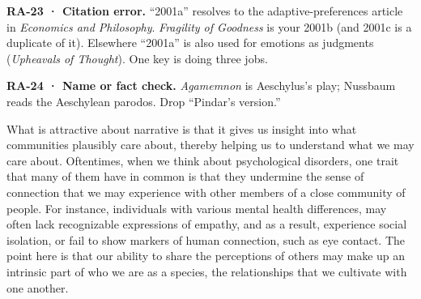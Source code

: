 \documentclass[
  letterpaper,
  DIV=11,
  numbers=noendperiod]{scrartcl}
\theoremstyle{remark}
\begin{document}
\begin{tcolorbox}[enhanced jigsaw, arc=.35mm, bottomrule=.15mm, bottomtitle=1mm, breakable, colback=white, colbacktitle=quarto-callout-warning-color!10!white, colframe=quarto-callout-warning-color-frame, coltitle=black, left=2mm, leftrule=.75mm, opacityback=0, opacitybacktitle=0.6, rightrule=.15mm, title=\textcolor{quarto-callout-warning-color}{\faExclamationTriangle}\hspace{0.5em}{Warning}, titlerule=0mm, toprule=.15mm, toptitle=1mm]

\textbf{RA-23 · Citation error.} ``2001a'' resolves to the
adaptive-preferences article in \emph{Economics and Philosophy}.
\emph{Fragility of Goodness} is your 2001b (and 2001c is a duplicate of
it). Elsewhere ``2001a'' is also used for emotions as judgments
(\emph{Upheavals of Thought}). One key is doing three jobs.

\end{tcolorbox}

\begin{tcolorbox}[enhanced jigsaw, arc=.35mm, bottomrule=.15mm, bottomtitle=1mm, breakable, colback=white, colbacktitle=quarto-callout-caution-color!10!white, colframe=quarto-callout-caution-color-frame, coltitle=black, left=2mm, leftrule=.75mm, opacityback=0, opacitybacktitle=0.6, rightrule=.15mm, title=\textcolor{quarto-callout-caution-color}{\faFire}\hspace{0.5em}{Caution}, titlerule=0mm, toprule=.15mm, toptitle=1mm]

\textbf{RA-24 · Name or fact check.} \emph{Agamemnon} is Aeschylus's
play; Nussbaum reads the Aeschylean parodos. Drop ``Pindar's version.''

\end{tcolorbox}

What is attractive about narrative is that it gives us insight into what
communities plausibly care about, thereby helping us to understand what
we may care about. Oftentimes, when we think about psychological
disorders, one trait that many of them have in common is that they
undermine the sense of connection that we may experience with other
members of a close community of people. For instance, individuals with
various mental health differences, may often lack recognizable
expressions of empathy, and as a result, experience social isolation, or
fail to show markers of human connection, such as eye contact. The point
here is that our ability to share the perceptions of others may make up
an intrinsic part of who we are as a species, the relationships that we
cultivate with one another.
\end{document}
